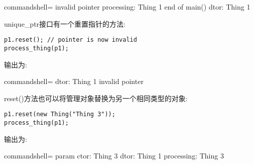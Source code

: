 \begin{tcblisting}{commandshell={}}
invalid pointer
processing: Thing 1
end of main()
dtor: Thing 1
\end{tcblisting}

unique\_ptr接口有一个重置指针的方法:

\begin{lstlisting}[style=styleCXX]
p1.reset(); // pointer is now invalid
process_thing(p1);
\end{lstlisting}

输出为:

\begin{tcblisting}{commandshell={}}
dtor: Thing 1
invalid pointer
\end{tcblisting}

reset()方法也可以将管理对象替换为另一个相同类型的对象:

\begin{lstlisting}[style=styleCXX]
p1.reset(new Thing("Thing 3"));
process_thing(p1);
\end{lstlisting}

输出为:

\begin{tcblisting}{commandshell={}}
param ctor: Thing 3
dtor: Thing 1
processing: Thing 3
\end{tcblisting}




















